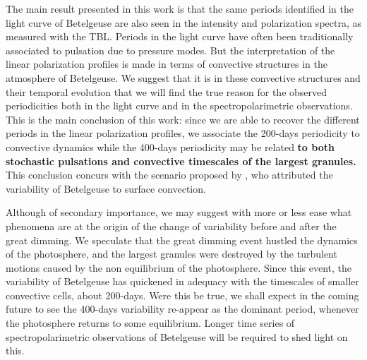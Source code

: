 \documentclass{aa}
\begin{document}
The main result  presented in this work is that the same periods identified in the light curve of Betelgeuse are also seen in the intensity and polarization
spectra, as measured with the TBL. Periods in the light curve have often been traditionally associated to pulsation due to pressure modes.
But the interpretation of the linear polarization profiles is made in terms of convective structures in the atmosphere of Betelgeuse. We suggest 
that it is in these convective structures and their temporal evolution that we will find the true reason for the observed periodicities both 
in the light curve and in the spectropolarimetric observations. This is the main conclusion of this work: since we are able to recover the different periods in the linear polarization profiles, 
we associate the 200-days periodicity to convective dynamics while the 400-days periodicity may be related \textbf{to both stochastic pulsations and convective timescales of the largest granules.} 
This conclusion concurs with the scenario proposed by \cite{gray_mass_2008}, who attributed the variability of Betelgeuse to surface convection. 

Although of secondary importance, we may suggest with more or less ease what phenomena are at the origin of the change of variability before and after the 
great dimming. We speculate that the great dimming event hustled the dynamics of the photosphere, and the largest granules were 
destroyed by the turbulent motions caused by the non equilibrium of the photosphere. Since this event, the variability of Betelgeuse has 
quickened  in adequacy with the timescales of  smaller convective cells, about 200-days. Were this be true, we shall expect in the 
coming future to see the 400-days variability re-appear as the dominant period, whenever  the photosphere returns to some equilibrium. 
Longer time  series of spectropolarimetric observations of Betelgeuse will be required to shed light on this.
\end{document}
